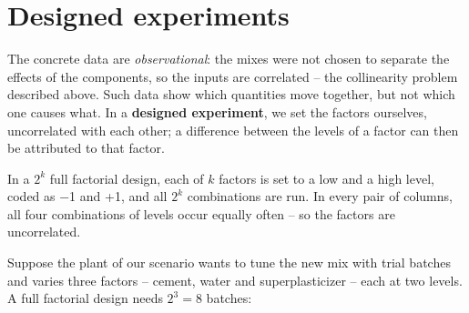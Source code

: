 \documentclass[
  letterpaper,
  DIV=11,
  numbers=noendperiod]{scrreprt}
\begin{document}
\section{Designed experiments}\label{designed-experiments}

The concrete data are \emph{observational}: the mixes were not chosen to
separate the effects of the components, so the inputs are correlated --
the collinearity problem described above. Such data show which
quantities move together, but not which one causes what. In a
\textbf{designed experiment}, we set the factors ourselves, uncorrelated
with each other; a difference between the levels of a factor can then be
attributed to that factor.

\begin{tcolorbox}[enhanced jigsaw, left=2mm, title=\textcolor{quarto-callout-note-color}{\faInfo}\hspace{0.5em}{Definition: Full factorial design}, opacityback=0, breakable, rightrule=.15mm, arc=.35mm, toptitle=1mm, colbacktitle=quarto-callout-note-color!10!white, opacitybacktitle=0.6, coltitle=black, colframe=quarto-callout-note-color-frame, bottomrule=.15mm, leftrule=.75mm, bottomtitle=1mm, titlerule=0mm, toprule=.15mm, colback=white]

In a \(2^k\) full factorial design, each of \(k\) factors is set to a
low and a high level, coded as −1 and +1, and all \(2^k\) combinations
are run. In every pair of columns, all four combinations of levels occur
equally often -- so the factors are uncorrelated.

\end{tcolorbox}

Suppose the plant of our scenario wants to tune the new mix with trial
batches and varies three factors -- cement, water and superplasticizer
-- each at two levels. A full factorial design needs \(2^3 = 8\)
batches:
\end{document}

